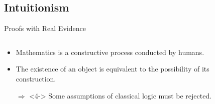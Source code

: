 \documentclass{beamer}
\begin{document}
\subsection{Intuitionism}
\begin{frame}{Proofs with Real Evidence}
	\vspace{\baselineskip}
	\begin{columns}[T,onlytextwidth]
	 \begin{column}{.65\textwidth}
	    \begin{itemize}
		\item<1-> Mathematics is a constructive process conducted by humans.
		\item<3-> The existence of an object is equivalent to the possibility of its construction.
		\item[$\Rightarrow$]<4-> Some assumptions of classical logic must be rejected.
	    \end{itemize}
	 \end{column}
	 \begin{column}{.3\textwidth}
		\centering

\end{column}
\end{columns}
\end{frame}
\end{document}
